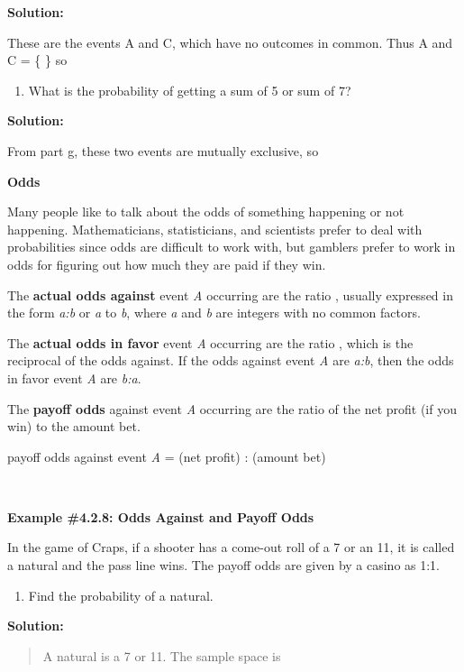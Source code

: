 \documentclass[]{book}
\providecommand{\tightlist}{%
  \setlength{\itemsep}{0pt}\setlength{\parskip}{0pt}}
\begin{document}
\textbf{Solution:}

These are the events A and C, which have no outcomes in common. Thus
A and C = \{ \} so

\begin{enumerate}
\def\labelenumi{\alph{enumi}.}
\setcounter{enumi}{7}
\tightlist
\item
  What is the probability of getting a sum of 5 or sum of 7?
\end{enumerate}

\textbf{Solution:}

From part g, these two events are mutually exclusive, so

\textbf{Odds}

Many people like to talk about the odds of something happening or not
happening. Mathematicians, statisticians, and scientists prefer to deal
with probabilities since odds are difficult to work with, but gamblers
prefer to work in odds for figuring out how much they are paid if they
win.

The \textbf{actual odds against} event \emph{A} occurring are the ratio , usually
expressed in the form \emph{a:b} or \emph{a} to \emph{b}, where \emph{a} and \emph{b} are
integers with no common factors.

The \textbf{actual odds in favor} event \emph{A} occurring are the ratio , which
is the reciprocal of the odds against. If the odds against event \emph{A} are
\emph{a:b}, then the odds in favor event \emph{A} are \emph{b:a}.

The \textbf{payoff odds} against event \emph{A} occurring are the ratio of the net
profit (if you win) to the amount bet.

payoff odds against event \emph{A} = (net profit) : (amount bet)

\textbf{\\
}

\textbf{Example \#4.2.8: Odds Against and Payoff Odds}

In the game of Craps, if a shooter has a come-out roll of a 7 or an 11,
it is called a natural and the pass line wins. The payoff odds are given
by a casino as 1:1.

\begin{enumerate}
\def\labelenumi{\alph{enumi}.}
\tightlist
\item
  Find the probability of a natural.
\end{enumerate}

\textbf{Solution:}

\begin{quote}
A natural is a 7 or 11. The sample space is
\end{quote}
\end{document}
